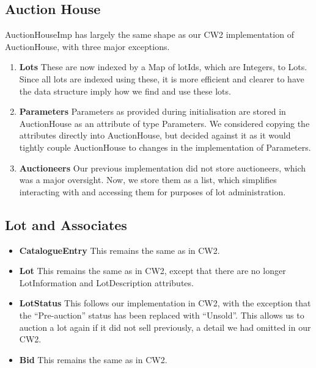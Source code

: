 \documentclass[titlepage, 12pt]{extarticle}
\begin{document}
\subsection{Auction House}
AuctionHouseImp has largely the same shape as
our CW2 implementation of AuctionHouse, with three major exceptions.
        \begin{enumerate}
            \item {\bf Lots} These are now indexed by a Map of lotIds, which are
                Integers, to Lots. Since all lots are indexed using these, it is
                more efficient and clearer to have the data structure imply how
                we find and use these lots.
            \item {\bf Parameters} Parameters as provided during initialisation
                are stored in AuctionHouse as an attribute of type Parameters. We
                considered copying the attributes directly into AuctionHouse,
                but decided against it as it would tightly couple AuctionHouse
                to changes in the implementation of Parameters.
            \item {\bf Auctioneers} Our previous implementation did not store
                auctioneers, which was a major oversight. Now, we store them as
                a list, which simplifies interacting with and accessing them for
                purposes of lot administration.
        \end{enumerate}
\subsection{Lot and Associates}
\begin{itemize}
    \item {\bf CatalogueEntry} This remains the same as in CW2.
    \item {\bf Lot} This remains the same as in CW2, except that there are no
        longer LotInformation and LotDescription attributes. 
    \item {\bf LotStatus} This follows our implementation in CW2, with the
        exception that the ``Pre-auction'' status has been replaced with
        ``Unsold''. This allows us to auction a lot again if it did not sell
        previously, a detail we had omitted in our CW2. 
      \item {\bf Bid} This remains the same as in CW2.
\end{itemize}
\end{document}
